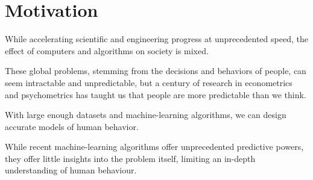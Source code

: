 \section{Motivation}
\label{in:sec:motivation}

While accelerating scientific and engineering progress at unprecedented speed, the effect of computers and algorithms on society is mixed.

These global problems, stemming from the decisions and behaviors of people, can seem intractable and unpredictable, but a century of research in econometrics and psychometrics has taught us that people are more predictable than we think.

With large enough datasets and machine-learning algorithms, we can design accurate models of human behavior.

While recent machine-learning algorithms offer unprecedented predictive powers, they offer little insights into the problem itself, limiting an in-depth understanding of human behaviour.

